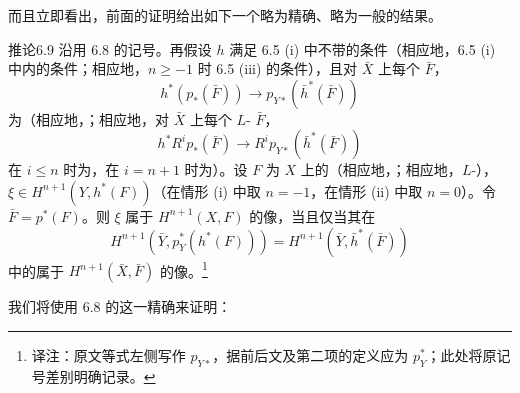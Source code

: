 而且立即看出，前面的证明给出如下一个略为精确、略为一般的结果。
\begin{SGAresult}{推论}{6.9}
沿用 6.8 的记号。再假设 $h$ 满足 6.5 (i) 中不带的条件（相应地，6.5 (i) 中内的条件；相应地，$n\geq-1$ 时 6.5 (iii) 的条件），且对 $\bar X$ 上每个 $\bar F$，
\[
h^*(p_*(\bar F))\longrightarrow p_{Y*}(\bar h^*(\bar F))
\]
为（相应地，；相应地，对 $\bar X$ 上每个 $L$- $\bar F$，
\[
h^*R^ip_*(\bar F)\longrightarrow R^ip_{Y*}(\bar h^*(\bar F))
\]
在 $i\leq n$ 时为，在 $i=n+1$ 时为）。设 $F$ 为 $X$ 上的（相应地，；相应地，$L$-），$\xi\in H^{n+1}(Y,h^*(F))$（在情形 (i) 中取 $n=-1$，在情形 (ii) 中取 $n=0$）。令 $\bar F=p^*(F)$。则 $\xi$ 属于 $H^{n+1}(X,F)$ 的像，当且仅当其在
\[
H^{n+1}(\bar Y,p_Y^*(h^*(F)))=H^{n+1}(\bar Y,\bar h^*(\bar F))
\]
中的属于 $H^{n+1}(\bar X,\bar F)$ 的像。\footnote{译注：原文等式左侧写作 $p_{Y*}$，据前后文及第二项的定义应为 $p_Y^*$；此处将原记号差别明确记录。}
\end{SGAresult}
我们将使用 6.8 的这一精确来证明：
